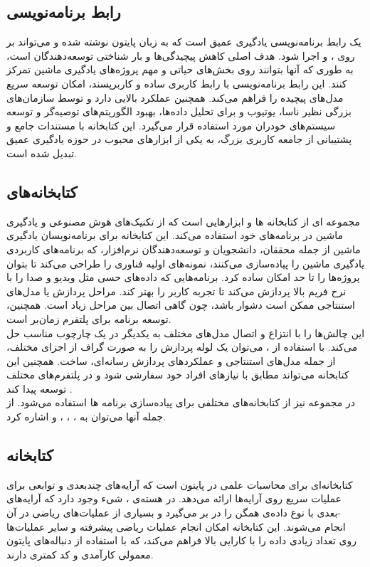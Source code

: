 \subsection{رابط برنامه‌نویسی }
 یک رابط برنامه‌نویسی یادگیری عمیق است که به زبان پایتون نوشته شده و می‌تواند بر روی ،  و  اجرا شود. هدف اصلی  کاهش پیچیدگی‌ها و بار شناختی توسعه‌دهندگان است، 
به طوری که آنها بتوانند روی بخش‌های حیاتی و مهم پروژه‌های یادگیری ماشین تمرکز کنند. این رابط برنامه‌نویسی با رابط کاربری ساده و کاربرپسند، امکان توسعه سریع مدل‌های پیچیده را فراهم
می‌کند.  همچنین عملکرد بالایی دارد و توسط سازمان‌های بزرگی نظیر ناسا، یوتیوب و  برای تحلیل داده‌ها، بهبود الگوریتم‌های توصیه‌گر و توسعه سیستم‌های خودران مورد استفاده قرار 
می‌گیرد. این کتابخانه با مستندات جامع و پشتیبانی از جامعه کاربری بزرگ، به یکی از ابزارهای محبوب در حوزه یادگیری عمیق تبدیل شده است.

\subsection{کتابخانه‌های}
 مجموعه ای از کتابخانه ها و ابزارهایی است که از تکنیک‌های هوش مصنوعی و یادگیری ماشین در برنامه‌های خود استفاده می‌کند.
این کتابخانه برای برنامه‌نویسان یادگیری ماشین از جمله محققان، دانشجویان و توسعه‌دهندگان نرم‌افزار، که برنامه‌های کاربردی یادگیری ماشین را پیاده‌سازی می‌کنند، نمونه‌های
اولیه فناوری را طراحی می‌کند تا بتوان پروژه‌ها را تا حد امکان ساده کرد.
برنامه‌هایی که داده‌های حسی مثل ویدیو و صدا را با نرخ فریم بالا پردازش می‌کند تا تجربه کاربر را بهتر کند. مراحل پردازش یا مدل‌های استنتاجی ممکن است دشوار باشد، چون 
گاهی اتصال بین مراحل زیاد است. همچنین، توسعه برنامه برای پلتفرم‌ زمان‌بر است. \cite{lugaresi2019mediapipe}
\\
 این چالش‌ها را با انتزاع و اتصال مدل‌های مختلف به یکدیگر در یک چارچوب مناسب حل می‌کند. با استفاده از ، می‌توان یک لوله پردازش را به صورت 
گراف از اجزای مختلف، از جمله مدل‌های استنتاجی و عملکردهای پردازش رسانه‌ای، ساخت.
همچنین این کتابخانه می‌تواند مطابق با نیازهای افراد خود سفارشی شود و در پلتفرم‌های مختلف توسعه پیدا کند \cite{harris2021applying}.
\\
در مجموعه  نیز از کتابخانه‌های مختلفی برای پیاده‌سازی برنامه ها استفاده می‌شود. از جمله آنها می‌توان به ، ، ،  و  اشاره کرد. \cite{harris2021applying}

\subsection{کتابخانه }
 کتابخانه‌ای برای محاسبات علمی در پایتون است که آرایه‌های چندبعدی و توابعی برای عملیات سریع روی آرایه‌ها ارائه می‌دهد. در هسته‌ی ، شیء  وجود 
دارد که آرایه‌های -بعدی با نوع داده‌ی همگن را در بر می‌گیرد و بسیاری از عملیات‌های ریاضی در آن انجام می‌شوند. این کتابخانه امکان انجام عملیات ریاضی پیشرفته و سایر 
عملیات‌ها روی تعداد زیادی داده را با کارایی بالا فراهم می‌کند، که با استفاده از دنباله‌های پایتون معمولی کارآمدی و کد کمتری دارند.


